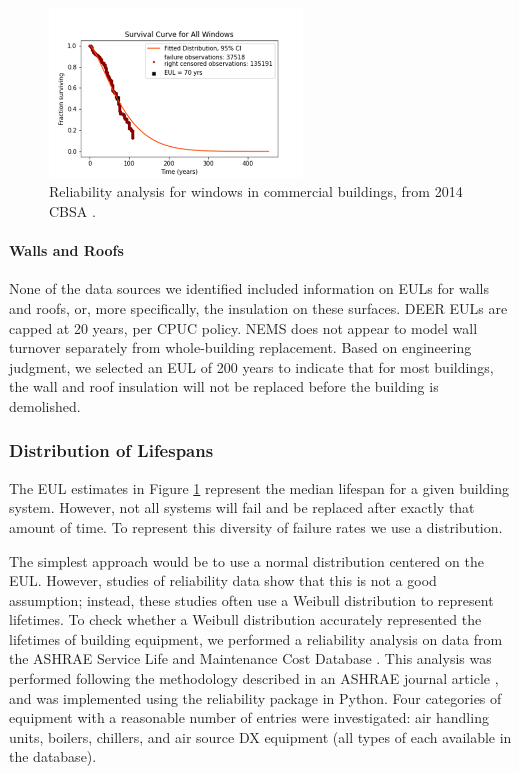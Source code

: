 \begin{figure}
\includegraphics[width=0.6\textwidth]{figures/window_survival_curve.png}
\centering
\caption[Reliability analysis for windows in commercial buildings]{Reliability analysis for windows in commercial buildings, from 2014 CBSA \citep{neea2014cbsa}.}
\label{fig:comWindowSurvivalCurve}
\end{figure}

\paragraph{Walls and Roofs}
None of the data sources we identified included information on EULs for walls and roofs, or, more specifically, the insulation on these surfaces. DEER EULs are capped at 20 years, per CPUC policy. NEMS does not appear to model wall turnover separately from whole-building replacement. Based on engineering judgment, we selected an EUL of 200 years to indicate that for most buildings, the wall and roof insulation will not be replaced before the building is demolished.

\subsubsection{Distribution of Lifespans}
The EUL estimates in Figure \ref{fig:comWindowSurvivalCurve} represent the median lifespan for a given building system. However, not all systems will fail and be replaced after exactly that amount of time. To represent this diversity of failure rates we use a distribution.

\par
The simplest approach would be to use a normal distribution centered on the EUL. However, studies of reliability data show that this is not a good assumption; instead, these studies often use a Weibull distribution to represent lifetimes. To check whether a Weibull distribution accurately represented the lifetimes of building equipment, we performed a reliability analysis on data from the ASHRAE Service Life and Maintenance Cost Database \citep{ashrae_reliability_db}. This analysis was performed following the methodology described in an ASHRAE journal article \citep{determine_equip_life}, and was implemented using the reliability package \citep{matthew_reid_2020_3938000} in Python. Four categories of equipment with a reasonable number of entries were investigated: air handling units, boilers, chillers, and air source DX equipment (all types of each available in the database).


